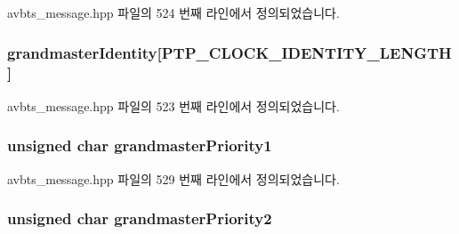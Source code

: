 avbts\+\_\+message.\+hpp 파일의 524 번째 라인에서 정의되었습니다.

\subsubsection[{\texorpdfstring{grandmaster\+Identity}{grandmasterIdentity}}]{ grandmaster\+Identity\mbox{[}{\bf P\+T\+P\+\_\+\+C\+L\+O\+C\+K\+\_\+\+I\+D\+E\+N\+T\+I\+T\+Y\+\_\+\+L\+E\+N\+G\+TH}\mbox{]}\hspace{0.3cm}{\ttfamily [private]}}\hypertarget{class_p_t_p_message_announce_aac45d13272e7f5bd9b06d2bf44c012af}{}\label{class_p_t_p_message_announce_aac45d13272e7f5bd9b06d2bf44c012af}


avbts\+\_\+message.\+hpp 파일의 523 번째 라인에서 정의되었습니다.

\subsubsection[{\texorpdfstring{grandmaster\+Priority1}{grandmasterPriority1}}]{\setlength{\rightskip}{0pt plus 5cm}unsigned char grandmaster\+Priority1\hspace{0.3cm}{\ttfamily [private]}}\hypertarget{class_p_t_p_message_announce_a93988c82dd819cc976c32f9e006b97e3}{}\label{class_p_t_p_message_announce_a93988c82dd819cc976c32f9e006b97e3}


avbts\+\_\+message.\+hpp 파일의 529 번째 라인에서 정의되었습니다.

\subsubsection[{\texorpdfstring{grandmaster\+Priority2}{grandmasterPriority2}}]{\setlength{\rightskip}{0pt plus 5cm}unsigned char grandmaster\+Priority2\hspace{0.3cm}{\ttfamily [private]}}\hypertarget{class_p_t_p_message_announce_a1e9e3c7867bf9eb557e5cf6edbd7f54a}{}\label{class_p_t_p_message_announce_a1e9e3c7867bf9eb557e5cf6edbd7f54a}


